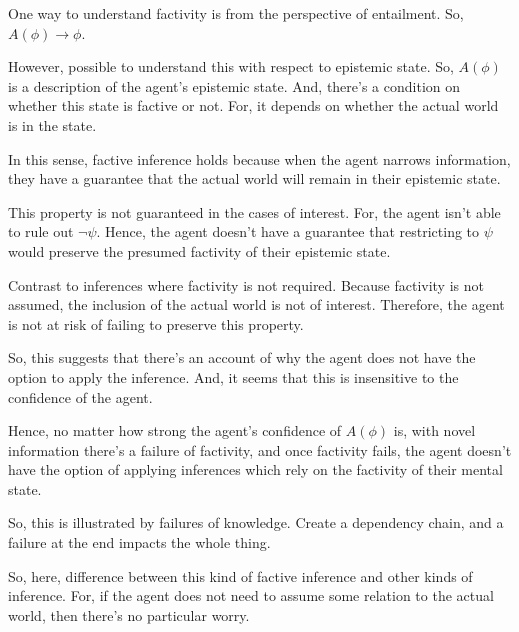 \documentclass[10pt]{article}
\begin{document}
\begin{note}
  One way to understand factivity is from the perspective of entailment.
  So, \(A(\phi) \rightarrow \phi\).

  However, possible to understand this with respect to epistemic state.
  So, \(A(\phi)\) is a description of the agent's epistemic state.
  And, there's a condition on whether this state is factive or not.
  For, it depends on whether the actual world is in the state.

  In this sense, factive inference holds because when the agent narrows information, they have a guarantee that the actual world will remain in their epistemic state.

  This property is not guaranteed in the cases of interest.
  For, the agent isn't able to rule out \(\lnot\psi\).
  Hence, the agent doesn't have a guarantee that restricting to \(\psi\) would preserve the presumed factivity of their epistemic state.

  Contrast to inferences where factivity is not required.
  Because factivity is not assumed, the inclusion of the actual world is not of interest.
  Therefore, the agent is not at risk of failing to preserve this property.

  So, this suggests that there's an account of why the agent does not have the option to apply the inference.
  And, it seems that this is insensitive to the confidence of the agent.

  Hence, no matter how strong the agent's confidence of \(A(\phi)\) is, with novel information there's a failure of factivity, and once factivity fails, the agent doesn't have the option of applying inferences which rely on the factivity of their mental state.

  So, this is illustrated by failures of knowledge.
  Create a dependency chain, and a failure at the end impacts the whole thing.

  So, here, difference between this kind of factive inference and other kinds of inference.
  For, if the agent does not need to assume some relation to the actual world, then there's no particular worry.
\end{note}
\end{document}
